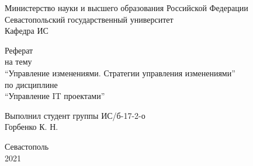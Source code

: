 \begin{titlepage}
    \thispagestyle{empty}
    
    \begin{center}
        
        Министерство науки и высшего образования Российской Федерации \\
        Севастопольский государственный университет \\
        Кафедра ИС
        
        \vfill

        Реферат \\
        на тему \\
        \enquote{Управление изменениями. Стратегии управления изменениями} \\
        по дисциплине \\
        \enquote{Управление IT проектами}

    \end{center}

    \vspace{1cm}

    \noindent\hspace{7.5cm} Выполнил студент группы ИС/б-17-2-о \\
    \null\hspace{7.5cm} Горбенко К. Н. \\

    \vfill

    \begin{center}
        Севастополь \\
        2021
    \end{center}

\end{titlepage}
